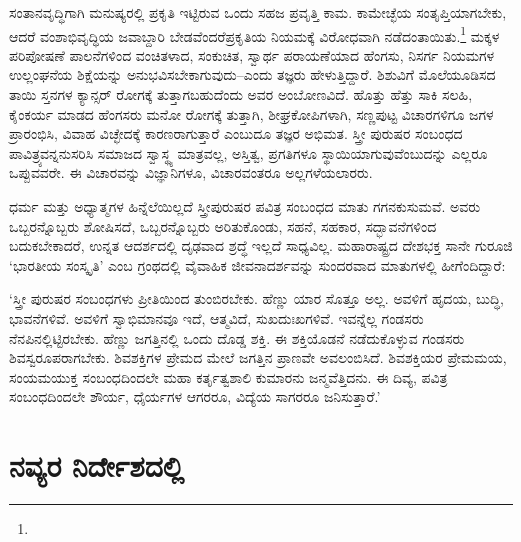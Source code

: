 ಸಂತಾನವೃದ್ಧಿಗಾಗಿ ಮನುಷ್ಯರಲ್ಲಿ ಪ್ರಕೃತಿ ಇಟ್ಟಿರುವ ಒಂದು ಸಹಜ ಪ್ರವೃತ್ತಿ ಕಾಮ. ಕಾಮೇಚ್ಛೆಯ ಸಂತೃಪ್ತಿಯಾಗಬೇಕು, ಆದರೆ ವಂಶಾಭಿವೃದ್ಧಿಯ ಜವಾಬ್ದಾರಿ ಬೇಡವೆಂದರೆ\break ಪ್ರಕೃತಿಯ ನಿಯಮಕ್ಕೆ ವಿರೋಧವಾಗಿ ನಡೆದಂತಾಯಿತು.\footnote{} ಮಕ್ಕಳ ಪರಿಪೋಷಣೆ ಪಾಲನೆಗಳಿಂದ ವಂಚಿತಳಾದ, ಸಂಕುಚಿತ, ಸ್ವಾರ್ಥ ಪರಾಯಣೆಯಾದ ಹೆಂಗಸು, ನಿಸರ್ಗ ನಿಯಮಗಳ ಉಲ್ಲಂಘನೆಯ ಶಿಕ್ಷೆಯನ್ನು ಅನುಭವಿಸಬೇಕಾಗುವುದು–ಎಂದು ತಜ್ಞರು ಹೇಳುತ್ತಿದ್ದಾರೆ. ಶಿಶುವಿಗೆ ಮೊಲೆಯೂಡಿಸದ ತಾಯಿ ಸ್ತನಗಳ ಕ್ಯಾನ್ಸರ್ ರೋಗಕ್ಕೆ ತುತ್ತಾಗಬಹುದೆಂದು ಅವರ ಅಂಬೋಣವಿದೆ. ಹೊತ್ತು ಹೆತ್ತು ಸಾಕಿ ಸಲಹಿ, ಕೈಂಕರ್ಯ ಮಾಡದ ಹೆಂಗಸರು ಮನೋ ರೋಗಕ್ಕೆ ತುತ್ತಾಗಿ, ಶೀಘ್ರಕೋಪಿಗಳಾಗಿ, ಸಣ್ಣಪುಟ್ಟ ವಿಚಾರಗಳಿಗೂ ಜಗಳ ಪ್ರಾರಂಭಿಸಿ, ವಿವಾಹ ವಿಚ್ಛೇದಕ್ಕೆ ಕಾರಣರಾಗುತ್ತಾರೆ ಎಂಬುದೂ ತಜ್ಞರ ಅಭಿಮತ. ಸ್ತ್ರೀ ಪುರುಷರ ಸಂಬಂಧದ ಪಾವಿತ್ರ್ಯವನ್ನನುಸರಿಸಿ ಸಮಾಜದ ಸ್ವಾಸ್ಥ್ಯ ಮಾತ್ರವಲ್ಲ, ಅಸ್ತಿತ್ವ, ಪ್ರಗತಿಗಳೂ ಸ್ಥಾಯಿ\-ಯಾಗುವು\-ವೆಂಬುದನ್ನು ಎಲ್ಲರೂ ಒಪ್ಪುವವರೇ. ಈ ವಿಚಾರವನ್ನು ವಿಜ್ಞಾನಿಗಳೂ, ವಿಚಾರವಂತರೂ ಅಲ್ಲಗಳೆಯಲಾರರು.

ಧರ್ಮ ಮತ್ತು ಅಧ್ಯಾತ್ಮಗಳ ಹಿನ್ನೆಲೆಯಿಲ್ಲದೆ ಸ್ತ್ರೀಪುರುಷರ ಪವಿತ್ರ ಸಂಬಂಧದ ಮಾತು ಗಗನಕುಸುಮವೆ. ಅವರು ಒಬ್ಬರನ್ನೊಬ್ಬರು ಶೋಷಿಸದೆ, ಒಬ್ಬರನ್ನೊಬ್ಬರು ಅರಿತುಕೊಂಡು, ಸಹನೆ, ಸಹಕಾರ, ಸದ್ಭಾವನೆಗಳಿಂದ ಬದುಕಬೇಕಾದರೆ, ಉನ್ನತ ಆದರ್ಶದಲ್ಲಿ ದೃಢವಾದ ಶ್ರದ್ಧೆ ಇಲ್ಲದೆ ಸಾಧ್ಯವಿಲ್ಲ. ಮಹಾರಾಷ್ಟ್ರದ ದೇಶಭಕ್ತ ಸಾನೇ ಗುರೂಜಿ ‘ಭಾರತೀಯ ಸಂಸ್ಕೃತಿ’ ಎಂಬ ಗ್ರಂಥದಲ್ಲಿ ವೈವಾಹಿಕ ಜೀವನಾದರ್ಶವನ್ನು ಸುಂದರವಾದ ಮಾತುಗಳಲ್ಲಿ ಹೀಗೆಂದಿದ್ದಾರೆ:

‘ಸ್ತ್ರೀ ಪುರುಷರ ಸಂಬಂಧಗಳು ಪ್ರೀತಿಯಿಂದ ತುಂಬಿರಬೇಕು. ಹೆಣ್ಣು ಯಾರ ಸೊತ್ತೂ ಅಲ್ಲ. ಅವಳಿಗೆ ಹೃದಯ, ಬುದ್ಧಿ, ಭಾವನೆಗಳಿವೆ. ಅವಳಿಗೆ ಸ್ವಾಭಿಮಾನವೂ ಇದೆ, ಆತ್ಮವಿದೆ, ಸುಖದುಃಖಗಳಿವೆ. ಇವನ್ನೆಲ್ಲ ಗಂಡಸರು ನೆನಪಿನಲ್ಲಿಟ್ಟಿರಬೇಕು. ಹೆಣ್ಣು ಜಗತ್ತಿನಲ್ಲಿ ಒಂದು ದೊಡ್ಡ ಶಕ್ತಿ. ಈ ಶಕ್ತಿಯೊಡನೆ ನಡೆದುಕೊಳ್ಳುವ ಗಂಡಸರು ಶಿವಸ್ವರೂಪರಾಗಬೇಕು. ಶಿವಶಕ್ತಿಗಳ ಪ್ರೇಮದ ಮೇಲೆ ಜಗತ್ತಿನ ಪ್ರಾಣವೇ ಅವಲಂಬಿಸಿದೆ. ಶಿವಶಕ್ತಿಯರ ಪ್ರೇಮಮಯ, ಸಂಯಮಯುಕ್ತ ಸಂಬಂಧದಿಂದಲೇ ಮಹಾ ಕರ್ತೃತ್ವಶಾಲಿ ಕುಮಾರನು ಜನ್ಮವೆತ್ತಿದನು. ಈ ದಿವ್ಯ, ಪವಿತ್ರ ಸಂಬಂಧದಿಂದಲೇ ಶೌರ್ಯ, ಧೈರ್ಯಗಳ ಆಗರರೂ, ವಿದ್ಯೆಯ ಸಾಗರರೂ ಜನಿಸುತ್ತಾರೆ.’


\section*{ನವ್ಯರ ನಿರ್ದೇಶದಲ್ಲಿ}


